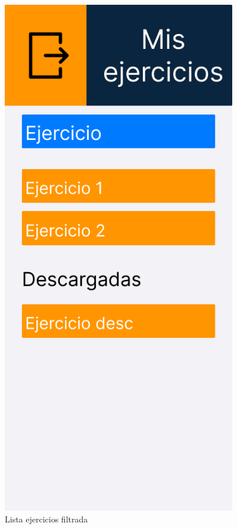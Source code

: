 \begin{figure}[H]
\begin{minipage}{0.45\textwidth}
      \label{fig:Lista ejercicios}
   \end{minipage}%
   \hspace{0.5cm}
   \begin{minipage}{0.45\textwidth}
      \centering
      \includegraphics[width=0.9\textwidth]{fotos/Frame 41.png}
      \caption{Lista ejercicios filtrada}
      \label{fig:Lista ejercicios filtrada}
   \end{minipage}
\end{figure}

